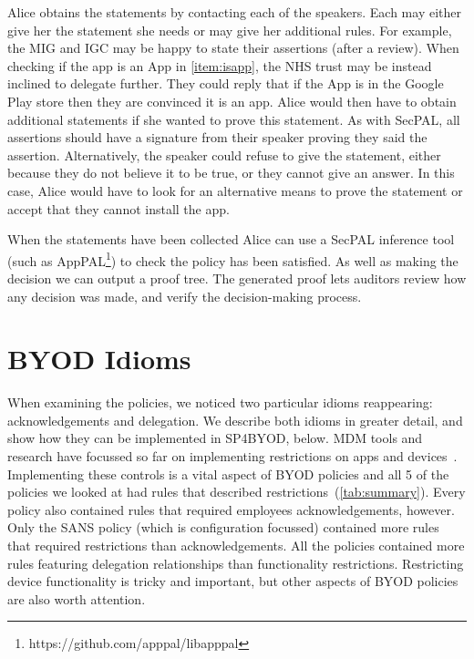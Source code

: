 \documentclass{llncs}
\newcommand{\AppPAL}[0]{SP4BYOD}
\begin{document}
Alice obtains the statements by contacting each of the speakers. 
Each may either give her the statement she needs or may give her additional rules.
For example, the MIG and IGC may be happy to state their assertions (after a review).
When checking if the app is an App in \autoref{item:isapp}, the NHS trust may be instead inclined to delegate further.
They could reply that if the App is in the Google Play store then they are convinced it is an app.
Alice would then have to obtain additional statements if she wanted to prove this statement.
As with SecPAL, all assertions should have a signature from their speaker proving they said the assertion.
Alternatively, the speaker could refuse to give the statement, either because they do not believe it to be true, or they cannot give an answer.
In this case, Alice would have to look for an alternative means to prove the statement or accept that they cannot install the app.

When the statements have been collected 
  Alice can use a SecPAL inference tool (such as AppPAL\footnote{https://github.com/apppal/libapppal}) to check the policy has been satisfied.
As well as making the decision we can output a proof tree.%
The generated proof lets auditors review how any decision was made, and verify the decision-making process.


\section{BYOD Idioms}

When examining the policies, we noticed two particular idioms reappearing: acknowledgements and delegation.
We describe both idioms in greater detail, and show how they can be implemented in \AppPAL{}, below.
MDM tools and research have focussed so far on implementing restrictions on apps and devices~\cite{_ibm_????,armando_formal_2014,martinelli_enhancing_2016}.
Implementing these controls is a vital aspect of BYOD policies and all 5 of the policies we looked at had rules that described restrictions~(\autoref{tab:summary}).
Every policy also contained rules that required employees acknowledgements, however.
Only the SANS policy (which is configuration focussed) contained more rules that required restrictions than acknowledgements. 
All the policies contained more rules featuring delegation relationships than functionality restrictions.
Restricting device functionality is tricky and important, but other aspects of BYOD policies are also worth attention.
\end{document}
